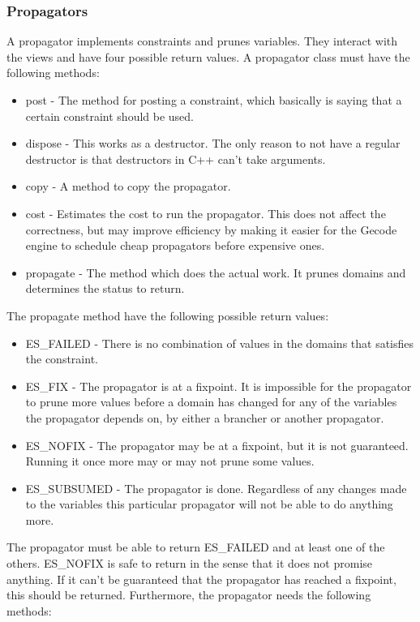\documentclass[a4paper,11pt]{article}
\begin{document}
\subsubsection{Propagators}
A propagator implements constraints and prunes variables. They interact with the views and have four possible return values. A propagator class must have the following methods:
\begin{itemize}
\item{post} - The method for posting a constraint, which basically is saying that a certain constraint should be used.
\item{dispose} - This works as a destructor. The only reason to not have a regular destructor is that destructors in C++ can't take arguments.
\item{copy} - A method to copy the propagator.
\item{cost} - Estimates the cost to run the propagator. This does not affect the correctness, but may improve efficiency by making it easier for the Gecode engine to schedule cheap propagators before expensive ones.
\item{propagate} - The method which does the actual work. It prunes domains and determines the status to return.
\end{itemize}
The propagate method have the following possible return values:
\begin{itemize}
\item{ES\_FAILED} - There is no combination of values in the domains that satisfies the constraint. 
\item{ES\_FIX} - The propagator is at a fixpoint. It is impossible for the propagator to prune more values before a domain has changed for any of the variables the propagator depends on, by either a brancher or another propagator.
\item{ES\_NOFIX} - The propagator may be at a fixpoint, but it is not guaranteed. Running it once more may or may not prune some values. 
\item{ES\_SUBSUMED} - The propagator is done. Regardless of any changes made to the variables this particular propagator will not be able to do anything more.
\end{itemize}
The propagator must be able to return ES\_FAILED and at least one of the others. ES\_NOFIX is safe to return in the sense that it does not promise anything. If it can't be guaranteed that the propagator has reached a fixpoint, this should be returned. Furthermore, the propagator needs the following methods:
\end{document}
